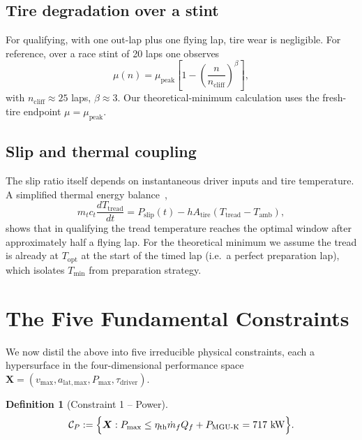 \documentclass[11pt,twocolumn]{article}
\theoremstyle{definition}
\newtheorem{definition}[theorem]{Definition}
\theoremstyle{remark}
\begin{document}
\subsection{Tire degradation over a stint}

For qualifying, with one out-lap plus one flying lap, tire wear is
negligible. For reference, over a race stint of 20 laps one observes
\begin{equation}
  \mu(n) = \mu_{\mathrm{peak}} \left[ 1 - \left(\frac{n}{n_{\mathrm{cliff}}}\right)^\beta \right],
  \label{eq:wear}
\end{equation}
with $n_{\mathrm{cliff}} \approx 25$ laps, $\beta \approx 3$. Our
theoretical-minimum calculation uses the fresh-tire endpoint
$\mu = \mu_{\mathrm{peak}}$.

\subsection{Slip and thermal coupling}

The slip ratio itself depends on instantaneous driver inputs and tire
temperature. A simplified thermal energy balance~\cite{persson2001,clark1981,savkoor1966,kummer1966},
\begin{equation}
  m_t c_t \frac{dT_{\mathrm{tread}}}{dt}
  = P_{\mathrm{slip}}(t) - h A_{\mathrm{tire}}
   (T_{\mathrm{tread}} - T_{\mathrm{amb}}),
  \label{eq:thermal}
\end{equation}
shows that in qualifying the tread temperature reaches the optimal window
after approximately half a flying lap. For the theoretical minimum we
assume the tread is already at $T_{\mathrm{opt}}$ at the start of the
timed lap (i.e.\ a perfect preparation lap), which isolates $T_{\min}$
from preparation strategy.

\section{The Five Fundamental Constraints}
\label{sec:five}

We now distil the above into five irreducible physical constraints, each
a hypersurface in the four-dimensional performance space
$\bm{X} = (v_{\max}, a_{\mathrm{lat,max}}, P_{\max}, \tau_{\mathrm{driver}})$.

\begin{definition}[Constraint 1 -- Power]
\[
  \mathcal{C}_P := \Bigl\{ \bm{X} :
  P_{\max} \le \eta_{\mathrm{th}} \dot m_f Q_f + P_{\mathrm{MGU\text{-}K}}
  = 717~\mathrm{kW} \Bigr\}.
\]
\end{definition}
\end{document}
